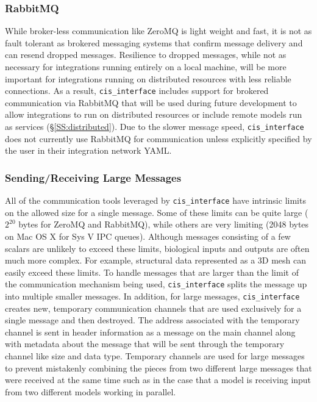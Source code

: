 \documentclass[journal]{IEEEtran}
\newcommand{\cis}{{\tt cis\_interface}{}}
\begin{document}
\subsubsection{RabbitMQ}\label{SSS:rmq}
%
While broker-less communication like ZeroMQ is light weight and fast, it is not as fault 
tolerant as brokered messaging systems that confirm message delivery and can resend 
dropped messages. Resilience to dropped messages, while not as necessary for integrations 
running entirely on a local machine, will be more important for integrations running on 
distributed resources with less reliable connections. As a result, {\cis} includes support 
for brokered communication via RabbitMQ \citep{RMQ} that will be used during future 
development to allow integrations to run on distributed resources or include remote models 
run as services (\S\ref{SS:distributed}). Due to the slower message speed, 
{\cis} does not currently use RabbitMQ for communication unless explicitly specified by the user in their 
integration network YAML. 

\subsubsection{Sending/Receiving Large Messages}\label{SSS:large}
%
All of the communication tools leveraged by {\cis} have intrinsic limits 
on the allowed size for a single message. Some of these limits can be quite large 
($2^{20}$ bytes for ZeroMQ and RabbitMQ), while others are very limiting 
(2048 bytes on Mac OS X for Sys V IPC queues). Although messages consisting of a few scalars are unlikely to 
exceed these limits, biological inputs and outputs are often much more complex. 
For example, structural data represented as a 3D mesh can easily exceed these 
limits. To handle messages that are larger than the limit of the communication 
mechanism being used, {\cis} splits the message up into multiple smaller 
messages. In addition, for large messages, {\cis} creates new, temporary 
communication channels that are used exclusively for a single message and 
then destroyed. The address associated with the temporary channel is sent in 
header information as a message on the main channel along with metadata about 
the message that will be sent through the temporary channel like size and data type. 
Temporary channels are used for large messages to prevent mistakenly combining 
the pieces from two different large messages that were received at the same time 
such as in the case that a model is receiving input from two different models 
working in parallel.
\end{document}
